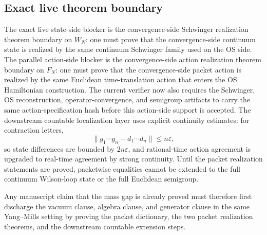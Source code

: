 \subsection*{Exact live theorem boundary}
The exact live state-side blocker is the convergence-side Schwinger realization
 theorem boundary on $W_N$: one must prove that the convergence-side continuum
state is realized by the same continuum Schwinger family used on the OS side.
The parallel action-side blocker is the convergence-side action realization
 theorem boundary on $F_N$: one must prove that the convergence-side packet
action is realized by the same Euclidean time-translation action that enters the
OS Hamiltonian construction. The current verifier now also requires the
Schwinger, OS reconstruction, operator-convergence, and semigroup artifacts to
carry the same action-specification hash before this action-side support is
accepted. The downstream countable localization layer uses explicit continuity
estimates: for contraction letters,
\[
\|g_1\cdots g_n-d_1\cdots d_n\|\leq n\varepsilon,
\]
so state differences are bounded by $2n\varepsilon$, and rational-time action
agreement is upgraded to real-time agreement by strong continuity. Until the
packet realization statements are proved,
packetwise equalities cannot be extended to the full continuum Wilson-loop state
or the full Euclidean semigroup.

Any manuscript claim that the mass gap is already proved must therefore first
discharge the vacuum clause, algebra clause, and generator clause in the same
Yang--Mills setting by proving the packet dictionary, the two packet realization
theorems, and the downstream countable extension steps.
\endinput
